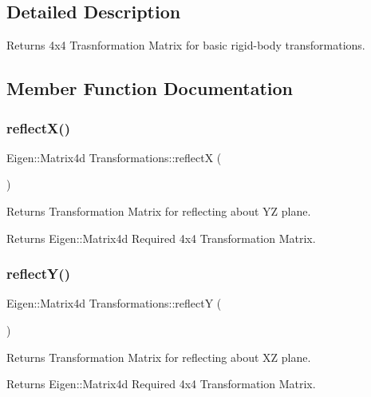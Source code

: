 \subsection{Detailed Description}
Returns 4x4 Trasnformation Matrix for basic rigid-\/body transformations. 

\subsection{Member Function Documentation}
\mbox{\label{classTransformations_a986ab195864427749bcba507a2d5fe58}} 
\subsubsection{\texorpdfstring{reflect\+X()}{reflectX()}}
{\footnotesize\ttfamily Eigen\+::\+Matrix4d Transformations\+::reflectX (\begin{DoxyParamCaption}{ }\end{DoxyParamCaption})}



Returns Transformation Matrix for reflecting about YZ plane. 

\begin{DoxyReturn}{Returns}
Eigen\+::\+Matrix4d Required 4x4 Transformation Matrix. 
\end{DoxyReturn}
\mbox{\label{classTransformations_a3ff59b80990ec879ed6d534dc620cee3}} 
\subsubsection{\texorpdfstring{reflect\+Y()}{reflectY()}}
{\footnotesize\ttfamily Eigen\+::\+Matrix4d Transformations\+::reflectY (\begin{DoxyParamCaption}{ }\end{DoxyParamCaption})}



Returns Transformation Matrix for reflecting about XZ plane. 

\begin{DoxyReturn}{Returns}
Eigen\+::\+Matrix4d Required 4x4 Transformation Matrix. 
\end{DoxyReturn}
\mbox{\label{classTransformations_afa74f1e98c9b69e368442c011d8cd046}} 
